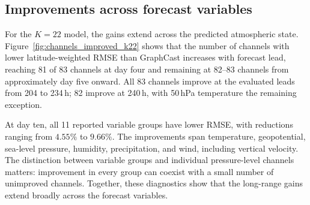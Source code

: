 \documentclass{article}
\begin{document}
\subsection{Improvements across forecast variables}
For the $K=22$ model, the gains extend across the predicted atmospheric state. Figure~\ref{fig:channels_improved_k22} shows that the number of channels with lower latitude-weighted RMSE than GraphCast increases with forecast lead, reaching 81 of 83 channels at day four and remaining at 82--83 channels from approximately day five onward. All 83 channels improve at the evaluated leads from 204 to 234\,h; 82 improve at 240\,h, with 50\,hPa temperature the remaining exception.

At day ten, all 11 reported variable groups have lower RMSE, with reductions ranging from $4.55\%$ to $9.66\%$. The improvements span temperature, geopotential, sea-level pressure, humidity, precipitation, and wind, including vertical velocity. The distinction between variable groups and individual pressure-level channels matters: improvement in every group can coexist with a small number of unimproved channels. Together, these diagnostics show that the long-range gains extend broadly across the forecast variables.
\end{document}
